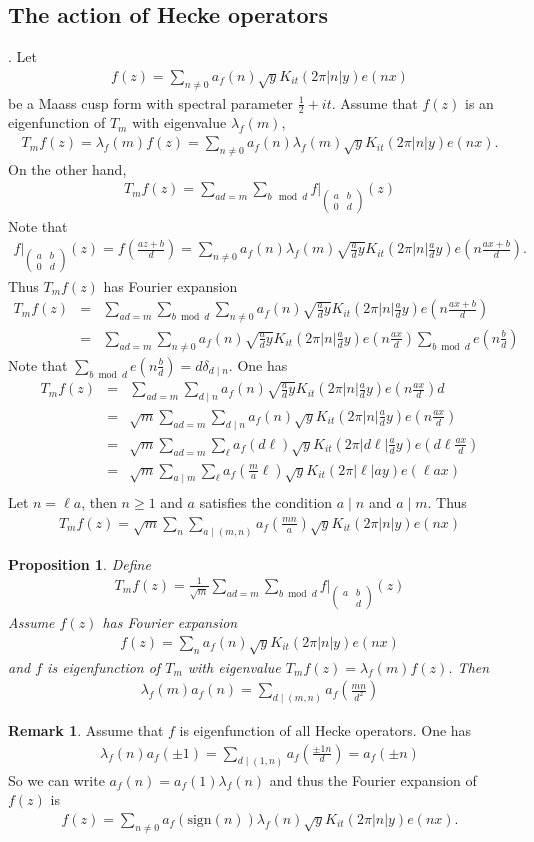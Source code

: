 \documentclass[11pt,reqno]{amsart}
\newcommand{\bea}{\begin{eqnarray}}
\newcommand{\eea}{\end{eqnarray}}
\newcommand{\bna}{\begin{eqnarray*}}
\newcommand{\ena}{\end{eqnarray*}}
\newcommand{\bma}{\begin{pmatrix}}
\newcommand{\ema}{\end{pmatrix}}
\newtheorem{prop}[lemma]{Proposition}
\theoremstyle{definition}
\newtheorem{remark}{Remark}
\begin{document}
\subsection{The action of Hecke operators}.
Let
\bna
f(z)=\sum_{n\neq 0} a_f(n)\sqrt{y}K_{it}(2\pi|n|y) e(nx)
\ena
be a Maass cusp form with spectral parameter $\frac{1}{2}+it$.
Assume that $f(z)$ is an eigenfunction of $T_m$ with eigenvalue $\lambda_f(m)$,
\bna
T_m f(z)=\lambda_f(m)f(z)=\sum_{n\neq 0} a_f(n)\lambda_f(m)\sqrt{y}K_{it}(2\pi|n|y) e(nx).
\ena
On the other hand,
\bna
T_mf(z)=\sum_{ad=m}\sum_{b\mod d} f|_{\bma a&b\\0&d\ema}(z)
\ena
Note that
\bna
f|_{\bma a&b\\0&d\ema}(z)
=f\left(\frac{az+b}{d}\right)=
\sum_{n\neq 0} a_f(n)\lambda_f(m)\sqrt{\frac{a}{d}y}K_{it}(2\pi|n|\frac{a}{d}y) e(n\frac{ax+b}{d}).
\ena
Thus $T_mf(z)$ has Fourier expansion
\bna
T_m f(z)&=&
\sum_{ad=m}\sum_{b\bmod d}
\sum_{n\neq 0} a_f(n)\sqrt{\frac{a}{d}y}K_{it}(2\pi|n|\frac{a}{d}y) e(n\frac{ax+b}{d})\\
&=&
\sum_{ad=m}
\sum_{n\neq 0} a_f(n)\sqrt{\frac{a}{d}y}K_{it}(2\pi|n|\frac{a}{d}y)
e(n\frac{ax}{d})
\sum_{b\bmod d}e\left(n\frac{b}{d}\right)
\ena
Note that $\sum_{b\bmod d}e\left(n\frac{b}{d}\right)=d\delta_{d\mid n}$.
One has
\bna
T_m f(z)
&=&
\sum_{ad=m}
\sum_{d\mid n} a_f(n)\sqrt{\frac{a}{d}y}K_{it}(2\pi|n|\frac{a}{d}y)
e(n\frac{ax}{d}) d\\
&=&\sqrt{m}
\sum_{ad=m}
\sum_{d\mid n} a_f(n)\sqrt{y}K_{it}(2\pi|n|\frac{a}{d}y)
e(n\frac{ax}{d}) \\
&=&\sqrt{m}
\sum_{ad=m}
\sum_{\ell } a_f(d\ell)\sqrt{y}K_{it}(2\pi|d\ell |\frac{a}{d}y)
e(d\ell \frac{ax}{d}) \\
&=&\sqrt{m}
\sum_{a\mid m}
\sum_{\ell } a_f(\frac{m}{a}\ell)\sqrt{y}K_{it}(2\pi|\ell |ay)
e(\ell a x) \\
\ena
Let $n=\ell a$, then $n\geq 1$ and $a$ satisfies the condition $a\mid n$ and $a\mid m$.
Thus
\bna
T_mf(z)=\sqrt{m}\sum_{n} \sum_{a\mid (m,n)}a_f\left(\frac{mn}{a}\right)
\sqrt{y} K_{it}(2\pi |n| y)e(nx)
\ena
\begin{prop}Define
\bna
T_mf(z)=\frac{1}{\sqrt{m}} \sum_{ad=m}\sum_{b\bmod d} f|_{\bma a&b\\&d\ema}(z)
\ena
Assume $f(z)$ has Fourier expansion
\bna
f(z)=\sum_{n}a_f(n)\sqrt{y} K_{it}(2\pi |n|y) e(nx)
\ena
and $f$ is eigenfunction of $T_m$ with eigenvalue $T_mf(z)=\lambda_f(m) f(z)$.
Then
\bea
\lambda_f(m)a_f(n)=\sum_{d\mid (m,n)} a_f\left(\frac{mn}{d^2}\right)\label{tem1}
\eea
\end{prop}
\begin{remark} Assume that $f$ is eigenfunction of  all Hecke operators.
One has
\bea
\lambda_f(n)a_f(\pm 1)=\sum_{d\mid (1,n)}a_f\left(\frac{\pm 1n}{d}\right)=a_f(\pm n)\label{tem2}
\eea
So we can write $a_f(n)=a_f(1)\lambda_f(n)$ and thus
 the Fourier expansion of $f(z)$ is
\bna
f(z)=\sum_{n\neq 0}a_f(\mathrm{sign}(n)) \lambda_f(n)
\sqrt{y}K_{it}(2\pi|n|y)e(nx).
\ena
 \end{remark}
\end{document}
